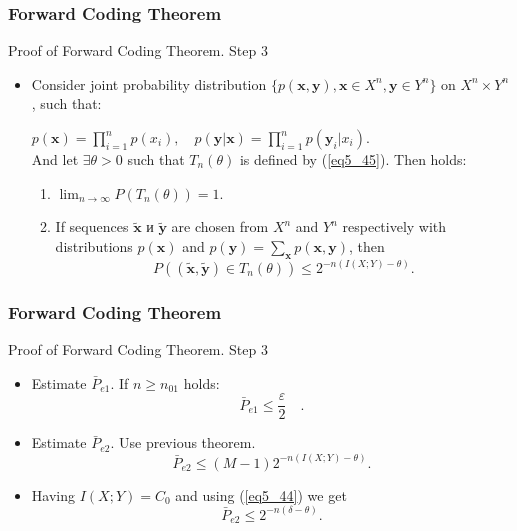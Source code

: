 \documentclass[14pt]{beamer}
\renewcommand{\vec}[1]{\ensuremath{\boldsymbol{#1}}}
\begin{document}
\begin{frame}
\frametitle{Forward Coding Theorem}
Proof of Forward Coding Theorem. Step 3
\begin{itemize}   

    \item 
    \begin{theorem}  \label{typ_pair}
    \small{
        Consider joint probability distribution $\{p(\vec x, \vec y), \vec x \in X^n, \vec y \in Y^n \}$ on  $X^n \times Y^n$, such that:
        
        $p(\vec x)= \prod_{i=1}^{n} p(x_i), \quad
        p(\vec y |\vec x)= \prod_{i=1}^{n} p(\vec y_i | x_i)$. \\
        
        And let $\exists \theta >0$ such that $T_n(\theta)$ is defined by (\ref{eq5_45}). Then holds:
        \begin{enumerate}
            \item $\lim_{n\rightarrow \infty} P\left(T_n(\theta)\right)=1$.
            \item If sequences $\tilde {\vec x}$ и $\tilde {\vec y}$ are chosen from $X^n$ and $Y^n$ respectively with distributions $p(\vec x)$ and $p(\vec y)=\sum_{\vec x} p(\vec x, \vec y)$, then
            \[
            P\left( (\tilde {\vec x}, \tilde {\vec y})\in T_n(\theta) \right)
            \le 2^{-n(I(X;Y)-\theta)}.
            \]
        \end{enumerate}
    }
    \end{theorem}


\end{itemize}
\end{frame}


\begin{frame}
\frametitle{Forward Coding Theorem}
Proof of Forward Coding Theorem. Step 3
\begin{itemize} 

    \item Estimate $\bar P_{e1} $. If $n\ge n_{01}$ holds:
    \begin{equation}\label{pe1}
    \bar P_{e1} \le \frac{\varepsilon}{2} \quad.
    \end{equation}

    \item Estimate $\bar P_{e2}$. Use previous theorem. 
    \begin{equation*}%
    \bar P_{e2} \le   (M-1) 2^{-n(I(X;Y)-\theta)}.
    \end{equation*}


    \item Having $I(X;Y)=C_0$ and using (\ref{eq5_44}) we get
    \begin{equation*}
    \bar P_{e2} \le 2^{-n(\delta-\theta)}.
    \end{equation*}
    
\end{itemize}
\end{frame}
\end{document}
